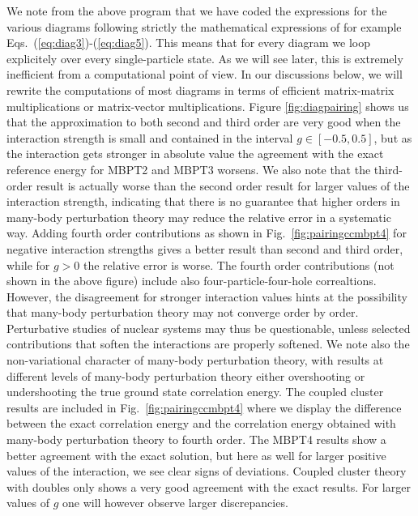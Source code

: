 We note from the above program that we have coded the expressions for
the various diagrams following strictly the mathematical expressions
of for example Eqs.~(\ref{eq:diag3})-(\ref{eq:diag5}).  This means
that for every diagram we loop explicitely over every single-particle
state. As we will see later, this is extremely inefficient from a
computational point of view. In our discussions below, we will rewrite
the computations of most diagrams in terms of efficient matrix-matrix
multiplications or matrix-vector multiplications.  Figure
\ref{fig:diagpairing} shows us that the approximation to both second
and third order are very good when the interaction strength is small
and contained in the interval $g\in[-0.5,0.5]$, but as the interaction
gets stronger in absolute value the agreement with the exact reference
energy for MBPT2 and MBPT3 worsens. We also note that the third-order
result is actually worse than the second order result for larger
values of the interaction strength, indicating that there is no
guarantee that higher orders in many-body perturbation theory may
reduce the relative error in a systematic way.  Adding fourth order
contributions as shown in Fig.~\ref{fig:pairingccmbpt4} for negative
interaction strengths gives a better result than second and third
order, while for $g>0$ the relative error is worse.  The fourth order
contributions (not shown in the above figure) include also
four-particle-four-hole correaltions.  However, the disagreement for
stronger interaction values hints at the possibility that many-body
perturbation theory may not converge order by order.  Perturbative
studies of nuclear systems may thus be questionable, unless selected
contributions that soften the interactions are properly softened.  We
note also the non-variational character of many-body perturbation
theory, with results at different levels of many-body perturbation
theory either overshooting or undershooting the true ground state
correlation energy.  The coupled cluster results are included in
Fig.~\ref{fig:pairingccmbpt4} where we display the difference between
the exact correlation energy and the correlation energy obtained with
many-body perturbation theory to fourth order.  The MBPT4 results show
a better agreement with the exact solution, but here as well for
larger positive values of the interaction, we see clear signs of
deviations. Coupled cluster theory with doubles only shows a very good
agreement with the exact results. For larger values of $g$ one will
however observe larger discrepancies.
